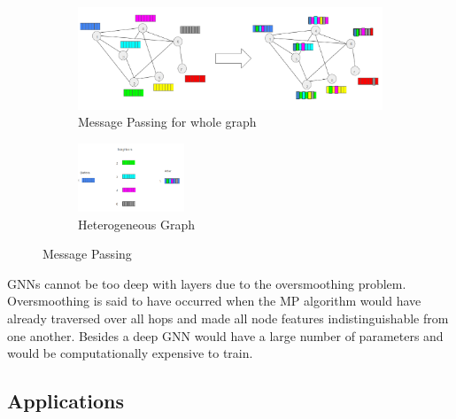\documentclass{report} %
\begin{document}
\begin{figure}[H]
    \centering
    \begin{subfigure}{\textwidth}
        \centering
        \includegraphics[width=.9\textwidth]{./ReportImages/HomogeneousMP.png} 
        \caption{Message Passing for whole graph} 
        \label{fig:Message Passing for whole graph}
    \end{subfigure}\vfill
    \begin{subfigure}{\textwidth}
        \centering
        \includegraphics[width=0.35\textwidth]{./ReportImages/HomogeneousMP1Node.png}
        \caption{Heterogeneous Graph}
        \label{fig:Message Passing for 1 Node}
    \end{subfigure}
    \caption{Message Passing}
    \label{fig:Message Passing}
\end{figure}

\ac{GNN}s cannot be too deep with layers due to the oversmoothing problem. 
Oversmoothing is said to have occurred when the \ac{MP} algorithm would have already traversed over all hops and made all node features indistinguishable from one another.
Besides a deep \ac{GNN} would have a large number of parameters and would be computationally expensive to train.

\subsection{Applications}\label{subsec:Applications}
\end{document}
